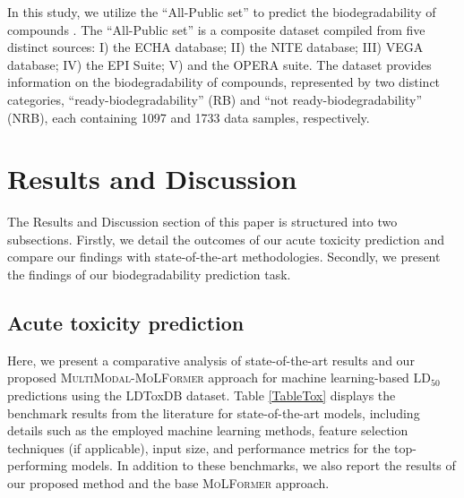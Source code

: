 \documentclass{article}
\begin{document}
In this study, we utilize the ``All-Public set'' to predict the biodegradability of compounds \cite{lee2022comparative}. The ``All-Public set'' is a composite dataset compiled from five distinct sources: I) the ECHA database; II) the NITE database; III) VEGA database; IV) the EPI Suite; V) and the OPERA suite. The dataset provides information on the biodegradability of compounds, represented by two distinct categories, ``ready-biodegradability'' (RB) and ``not ready-biodegradability'' (NRB), each containing 1097 and 1733 data samples, respectively.


\section{Results and Discussion}

The Results and Discussion section of this paper is structured into two subsections. Firstly, we detail the outcomes of our acute toxicity prediction and compare our findings with state-of-the-art methodologies. Secondly, we present the findings of our biodegradability prediction task.

\subsection{Acute toxicity prediction}

Here, we present a comparative analysis of state-of-the-art results and our proposed \textsc{MultiModal}-\textsc{MoLFormer} approach for machine learning-based $\text{LD}_{50}$ predictions using the LDToxDB dataset. Table \ref{TableTox} displays the benchmark results from the literature for state-of-the-art models, including details such as the employed machine learning methods, feature selection techniques (if applicable), input size, and performance metrics for the top-performing models. In addition to these benchmarks, we also report the results of our proposed method and the base \textsc{MoLFormer} approach.
\end{document}
